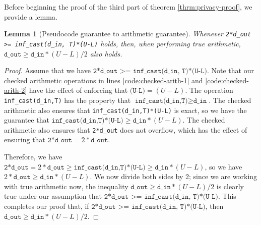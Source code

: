 \documentclass[11pt,a4paper]{article}
\newtheorem{lemma}[theorem]{Lemma}
\theoremstyle{definition}
\newcommand{\din}{\texttt{d\_in}}
\newcommand{\dout}{\texttt{d\_out}}
\begin{document}
    Before beginning the proof of the third part of theorem \ref{thrm:privacy-proof}, we provide a lemma.
    
    \begin{lemma}[Pseudocode guarantee to arithmetic guarantee]
    \label{lemma:pseudo-to-arith}
    Whenever \texttt{2*d\_out >= inf\_cast(d\_in, T)*(U-L)} holds, then, when performing true arithmetic, $\dout \geq \din * (U-L)/2$ also holds.
    \end{lemma}
    
    
    \begin{proof}
    Assume that we have $\texttt{2*d\_out >= inf\_cast(d\_in, T)*(U-L)}$. Note that our checked arithmetic operations in lines \ref{code:checked-arith-1} and \ref{code:checked-arith-2} have the effect of enforcing that $\texttt{(U-L)} = (U-L)$. The operation \texttt{inf\_cast(d\_in,T)} has the property that $\texttt{inf\_cast(d\_in,T)} \geq \texttt{d\_in}$. The checked arithmetic also ensures that \texttt{inf\_cast(d\_in,T)*(U-L)} is exact, so we have the guarantee that $\texttt{inf\_cast(d\_in,T)*(U-L)}\geq \din*(U-L)$. The checked arithmetic also ensures that \texttt{2*d\_out} does not overflow, which has the effect of ensuring that $\texttt{2*d\_out} = 2*\dout$.
    
    Therefore, we have $\texttt{2*d\_out} = 2*\dout \geq \texttt{inf\_cast(d\_in,T)*(U-L)}\geq \din*(U-L)$, so we have $2*\dout\geq \din*(U-L)$. We now divide both sides by 2; since we are working with true arithmetic now, the inequality $\dout\geq \din*(U-L)/2$ is clearly true under our assumption that $\texttt{2*d\_out >= inf\_cast(d\_in, T)*(U-L)}$. This completes our proof that, if $\texttt{2*d\_out >= inf\_cast(d\_in, T)*(U-L)}$, then $\dout \geq \din * (U-L)/2$.
    \end{proof}
    
\end{document}
